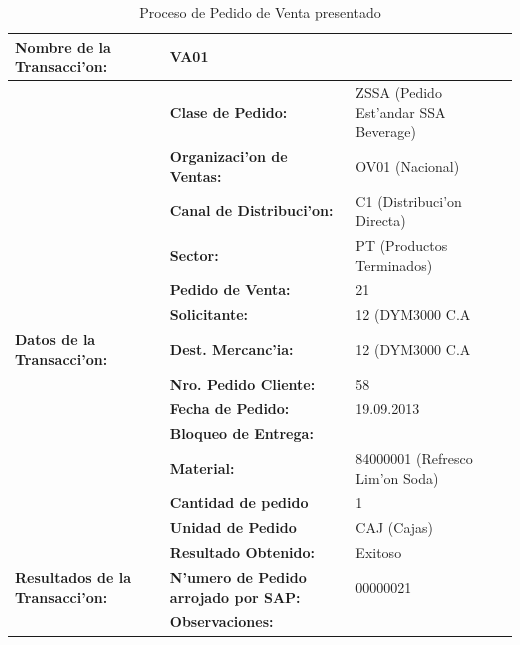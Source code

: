 \begin{table}[h!]
\footnotesize
\scalebox{0.8} {
\begin{tabular}{l l l}
\toprule
\textbf{Nombre de la Transacci'on:} & VA01 &\\
\midrule
                 & \textbf{Clase de Pedido:} & ZSSA (Pedido Est'andar SSA Beverage) \\
                 \cmidrule{2-3}
                 & \textbf{Organizaci'on de Ventas:} & OV01 (Nacional) \\
                 \cmidrule{2-3}
                 & \textbf{Canal de Distribuci'on:} & C1 (Distribuci'on Directa) \\
                 \cmidrule{2-3}
                 & \textbf{Sector:}                   &   PT (Productos Terminados) \\
                 \cmidrule{2-3}
                 & \textbf{Pedido de Venta:}            & 21 \\
                 \cmidrule{2-3}
                 & \textbf{Solicitante:}              & 12 (DYM3000 C.A \\
                \cmidrule{2-3}
  \textbf{Datos de la Transacci'on:}              & \textbf{Dest. Mercanc'ia:}   &   12 (DYM3000 C.A \\
                 \cmidrule{2-3}
                 & \textbf{Nro. Pedido Cliente:} & 58      \\
                 \cmidrule{2-3}
                 & \textbf{Fecha de Pedido:} & 19.09.2013 \\
                 \cmidrule{2-3}
                 & \textbf{Bloqueo de Entrega:}  &      \\
                 \cmidrule{2-3}
                 & \textbf{Material:} & 84000001 (Refresco Lim'on Soda) \\
                 \cmidrule{2-3}
                 & \textbf{Cantidad de pedido} & 1 \\
                 \cmidrule{2-3}
                 & \textbf{Unidad de Pedido} & CAJ (Cajas) \\
                 \midrule
                 & \textbf{Resultado Obtenido:} & Exitoso \\
                 \cmidrule{2-3}
\textbf{Resultados de la Transacci'on:}    & \textbf{N'umero de Pedido arrojado por SAP:} & 00000021 \\
                 \cmidrule{2-3}
                 & \textbf{Observaciones:} &  \\
                 \bottomrule
\end{tabular}}
\caption{Proceso de Pedido de Venta presentado}
\label{tb:pedido}
\end{table}
